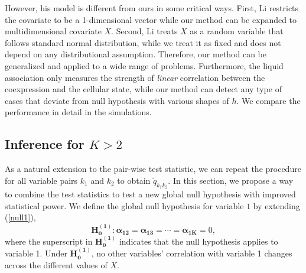 \documentclass[12pt]{article}
\theoremstyle{theorem}
\begin{document}
\noindent However, his model is different from ours in some critical ways. First, Li restricts the covariate to be a 1-dimensional vector while our method can be expanded to multidimensional covariate $X$. Second, Li treats $X$ as a random variable that follows standard normal distribution, while we treat it as fixed and does not depend on any distributional assumption. Therefore, our method can be generalized and applied to a wide range of problems. Furthermore, the liquid association only measures the strength of \textit{linear} correlation between the coexpression and the cellular state, while our method can detect any type of cases that deviate from null hypothesis with various shapes of $h$. We compare the performance in detail in the simulations. 

\subsection{Inference for $K>2$}
As a natural extension to the pair-wise test statistic, we can repeat the procedure for all variable pairs $k_1$ and $k_2$ to obtain $\tilde{q}_{k_1k_2}$. In this section, we propose a way to combine the test statistics to test a new global null hypothesis with improved statistical power. We define the global null hypothesis for variable $1$ by extending (\ref{null1}),
\begin{equation}
    \bm{H_0^{(1)}}: \bm{\alpha_{12}} = \bm{\alpha_{13}} = \cdots = \bm{\alpha_{1K}} = 0,
\label{newnull}
\end{equation}
where the superscript in $\bm{H_0^{(1)}}$ indicates that the null hypothesis applies to variable 1. Under $\bm{H_0^{(1)}}$, no other variables' correlation with variable 1 changes across the different values of  $X$. \\
\end{document}

